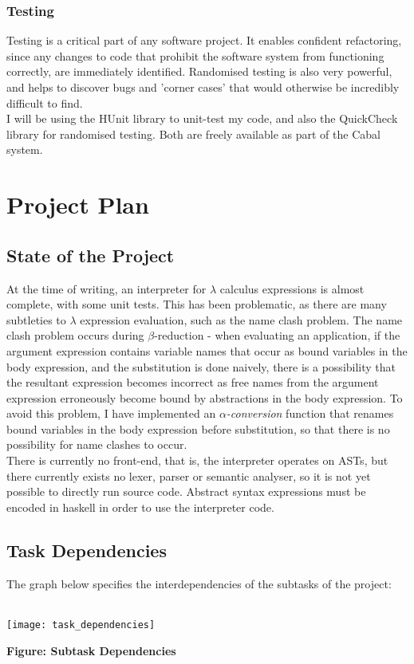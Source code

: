 \documentclass{article}
\begin{document}
\subsubsection{Testing}
Testing is a critical part of any software project. It enables confident refactoring, since any changes to code that prohibit the software system from functioning correctly, are immediately identified. Randomised testing is also very powerful, and helps to discover bugs and 'corner cases' that would otherwise be incredibly difficult to find.
\\
\indent I will be using the HUnit library to unit-test my code, and also the QuickCheck library for randomised testing. Both are freely available as part of the Cabal system.

\pagebreak
\section{Project Plan}
\subsection{State of the Project} %
At the time of writing, an interpreter for $\lambda$ calculus expressions is almost complete, with some unit tests. This has been problematic, as there are many subtleties to $\lambda$ expression evaluation, such as the name clash problem. The name clash problem occurs during $\beta$-reduction - when evaluating an application, if the argument expression contains variable names that occur as bound variables in the body expression, and the substitution is done naively, there is a possibility that the resultant expression becomes incorrect as free names from the argument expression erroneously become bound by abstractions in the body expression. To avoid this problem, I have implemented an \emph{$\alpha$-conversion} function that renames bound variables in the body expression before substitution, so that there is no possibility for name clashes to occur.
\\
\indent There is currently no front-end, that is, the interpreter operates on ASTs, but there currently exists no lexer, parser or semantic analyser, so it is not yet possible to directly run source code. Abstract syntax expressions must be encoded in haskell in order to use the interpreter code.

\subsection{Task Dependencies}
The graph below specifies the interdependencies of the subtasks of the project:
\\\\
\centerline{\texttt{[image: task\_dependencies]}}
\centerline{\textbf{Figure: Subtask Dependencies}}
\end{document}
